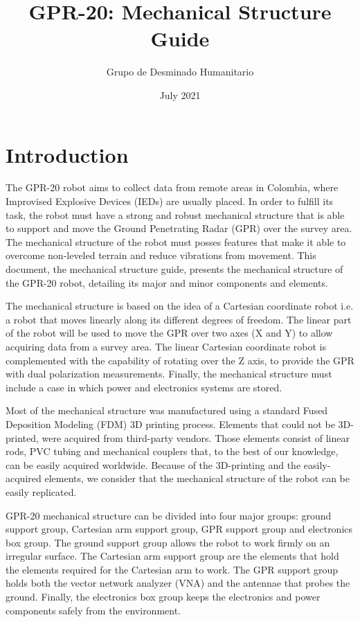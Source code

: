 \documentclass{article}
\title{GPR-20: Mechanical Structure Guide}
\author{Grupo de Desminado Humanitario}
\date{July 2021}
\begin{document}


\newpage
\section{Introduction}
The GPR-20 robot aims to collect data from remote areas in Colombia, where Improvised Explosive Devices (IEDs) are usually placed. In order to fulfill its task, the robot must have a strong and robust mechanical structure that is able to support and move the Ground Penetrating Radar (GPR) over the survey area. The mechanical structure of the robot must posses features that make it able to overcome non-leveled terrain and reduce vibrations from movement. This document, the mechanical structure guide, presents the mechanical structure of the GPR-20 robot, detailing its major and minor components and elements. 

The mechanical structure is based on the idea of a Cartesian coordinate robot i.e. a robot that moves linearly along its different degrees of freedom. The linear part of the robot will be used to move the GPR over two axes (X and Y) to allow acquiring data from a survey area. The linear Cartesian coordinate robot is complemented with the capability of rotating over the Z axis, to provide the GPR with dual polarization measurements. Finally, the mechanical structure must include a case in which power and electronics systems are stored.

Most of the mechanical structure was manufactured using a standard Fused Deposition Modeling (FDM) 3D printing process. Elements that could not be 3D-printed, were acquired from third-party vendors. Those elements consist of linear rods, PVC tubing and mechanical couplers that, to the best of our knowledge, can be easily acquired worldwide. Because of the 3D-printing and the easily-acquired elements, we consider that the mechanical structure of the robot can be easily replicated. 

GPR-20 mechanical structure can be divided into four major groups: ground support group, Cartesian arm support group, GPR support group and electronics box group. The ground support group allows the robot to work firmly on an irregular surface. The Cartesian arm support group are the elements that hold the elements required for the Cartesian arm to work. The GPR support group holds both the vector network analyzer (VNA) and the antennae that probes the ground. Finally, the electronics box group keeps the electronics and power components safely from the environment.
\end{document}
